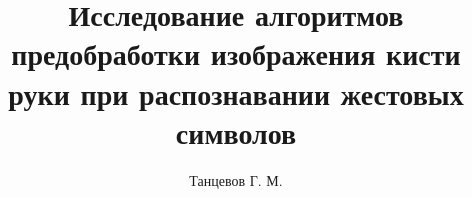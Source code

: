 \title{Исследование алгоритмов предобработки изображения кисти руки при распознавании жестовых символов}

\author[addr1]{Танцевов Г. М.}


\address[addr1]{МГТУ им. Н. Э. Баумана, Москва, Россия}
